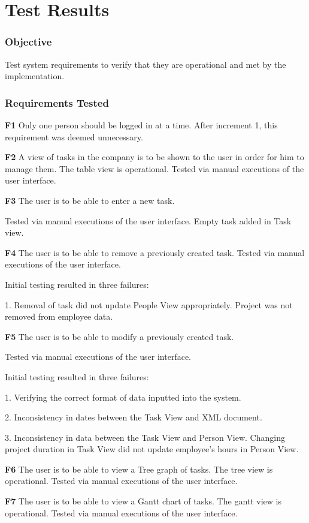 \documentclass[12pt]{article}
\begin{document}
\section{Test Results}
\subsubsection{Objective} 
{
Test system requirements to verify that they are operational and met by the implementation.
}
\subsubsection{Requirements Tested} 
{
  {\bf F1} Only one person should be logged in at a time.
    After increment 1, this requirement was deemed unnecessary.

  {\bf F2} A view of tasks in the company is to be shown to the user in order for him to manage
them.
    The table view is operational. Tested via manual executions of the user interface.  

  {\bf F3} The user is to be able to enter a new task.

Tested via manual executions of the user interface. Empty task added in Task view.

  {\bf F4} The user is to be able to remove a previously created task.
    Tested via manual executions of the user interface.

Initial testing resulted in three failures:

1. Removal of task did not update People View appropriately. Project was not removed from employee data.

  {\bf F5} The user is to be able to modify a previously created task.

Tested via manual executions of the user interface.

Initial testing resulted in three failures:

1. Verifying the correct format of data inputted into the system.

2. Inconsistency in dates between the Task View and XML document.

3. Inconsistency in data between the Task View and Person View. Changing project duration in Task View did not update employee's hours in Person View.

   {\bf F6} The user is to be able to view a Tree graph of tasks.
    The tree view is operational. Tested via manual executions of the user interface.  

   {\bf F7} The user is to be able to view a Gantt chart of tasks.
    The gantt view is operational. Tested via manual executions of the user interface.  

}
\end{document}
